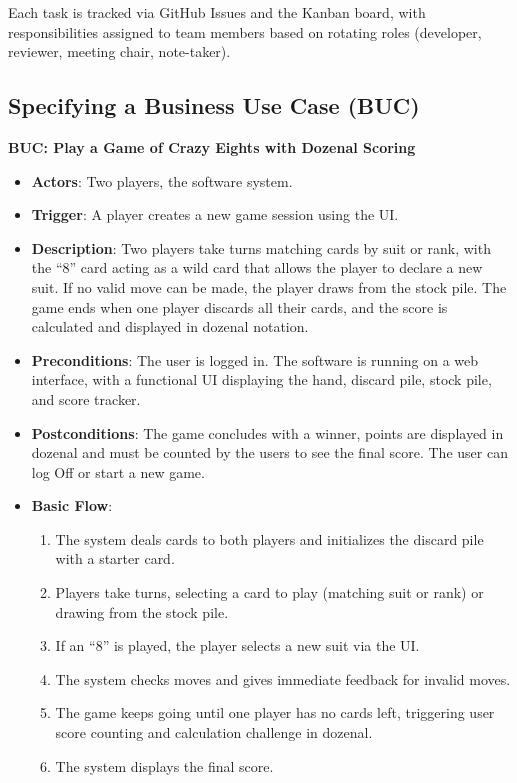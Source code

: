 \documentclass[12pt]{article}
\begin{document}
Each task is tracked via GitHub Issues and the Kanban board, with responsibilities assigned to team members based on rotating roles (developer, reviewer, meeting chair, note-taker).

\subsection{Specifying a Business Use Case (BUC)}

\textbf{BUC: Play a Game of Crazy Eights with Dozenal Scoring}

\begin{itemize}
    \item \textbf{Actors}: Two players, the software system.
    \item \textbf{Trigger}: A player creates a new game session using the UI.
    \item \textbf{Description}: Two players take turns matching cards by suit or rank, with the ``8'' card acting as a wild card that allows the player to declare a new suit. If no valid move can be made, the player draws from the stock pile. The game ends when one player discards all their cards, and the score is calculated and displayed in dozenal notation.
    \item \textbf{Preconditions}: The user is logged in. The software is running on a web interface, with a functional UI displaying the hand, discard pile, stock pile, and score tracker.
    \item \textbf{Postconditions}: The game concludes with a winner, points are displayed in dozenal and must be counted by the users to see the final score. The user can log Off or start a new game.
    \item \textbf{Basic Flow}:
    \begin{enumerate}
        \item The system deals cards to both players and initializes the discard pile with a starter card.
        \item Players take turns, selecting a card to play (matching suit or rank) or drawing from the stock pile.
        \item If an ``8'' is played, the player selects a new suit via the UI.
        \item The system checks moves and gives immediate feedback for invalid moves.
        \item The game keeps going until one player has no cards left, triggering user score counting and calculation challenge in dozenal.
        \item The system displays the final score.

\end{enumerate}
\end{itemize}
\end{document}
